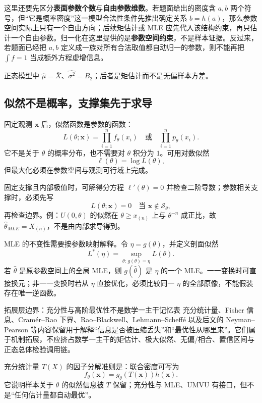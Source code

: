 \documentclass[11pt,a4paper]{ctexart}
\newcommand{\kw}[1]{\textbf{\color{deep}#1}}
\begin{document}
这里还要先区分\kw{表面参数个数}与\kw{自由参数维数}。若题面给出的密度含 $a,b$ 两个符号，但“它是概率密度”这一模型合法性条件先推出确定关系 $b=h(a)$，那么参数空间实际上只有一个自由方向；后续矩估计或 MLE 应先代入该结构约束，再只估计一个自由参数。归一化在这里提供的是\kw{参数空间约束}，不是样本证据。反过来，若题面已经把 $a,b$ 定义成一族对所有合法取值都自动归一的参数，则不能再把 $\int f=1$ 当成额外方程虚增信息。

正态模型中 $\widehat\mu=\bar X$、$\widehat{\sigma^2}=B_2$；后者是矩估计而不是无偏样本方差。

\subsection{似然不是概率，支撑集先于求导}

固定观测 $\boldsymbol x$ 后，似然函数是参数的函数：
\[
L(\theta;\boldsymbol x)=\prod_{i=1}^nf_\theta(x_i)\quad\text{或}\quad\prod_{i=1}^np_\theta(x_i).
\]
它不是关于 $\theta$ 的概率分布，也不需要对 $\theta$ 积分为 $1$。可用对数似然
\[
\ell(\theta)=\log L(\theta),
\]
但最大化必须在参数空间与观测可行域上完成。

固定支撑且内部极值时，可解得分方程 $\ell'(\theta)=0$ 并检查二阶导数；参数相关支撑时，必须先写
\[
L(\theta;\boldsymbol x)=0\quad\text{当 }\boldsymbol x\notin\mathcal S_\theta,
\]
再检查边界。例：$U(0,\theta)$ 的似然在 $\theta\ge x_{(n)}$ 上与 $\theta^{-n}$ 成正比，故 $\widehat\theta_{MLE}=X_{(n)}$，不是由内部求导得到。

MLE 的不变性需要按参数映射解释。令 $\eta=g(\theta)$，并定义剖面似然
\[
L^*(\eta)=\sup_{\theta:\,g(\theta)=\eta}L(\theta).
\]
若 $\widehat\theta$ 是原参数空间上的全局 MLE，则 $g(\widehat\theta)$ 是 $\eta$ 的一个 MLE。一一变换时可直接换元；非一一变换时若从 $\eta$ 直接优化，必须比较同一 $\eta$ 的全部原像，不能假装存在唯一逆函数。

\begin{warnbox}{拓展层边界：充分性与高阶最优性不是数学一主干记忆表}
充分统计量、Fisher 信息、Cramér--Rao 下界、Rao--Blackwell、Lehmann--Scheffé 以及后文的 Neyman--Pearson 等内容保留用于解释“信息是否被压缩丢失”和“最优性从哪里来”。它们属于机制拓展，不应挤占数学一主干的矩估计、极大似然、无偏/相合、置信区间与正态总体检验调用链。
\end{warnbox}

充分统计量 $T(X)$ 的因子分解准则是：联合密度可写为
\[
f_\theta(\boldsymbol x)=g_\theta(T(\boldsymbol x))h(\boldsymbol x).
\]
它说明样本关于 $\theta$ 的似然信息被 $T$ 保留；充分性与 MLE、UMVU 有接口，但不是“任何估计量都自动最优”。
\end{document}
